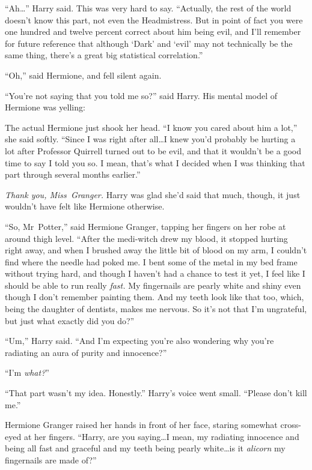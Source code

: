 “Ah…” Harry said. This was very hard to say. “Actually, the rest of the world doesn’t know this part, not even the Headmistress. But in point of fact you were one hundred and twelve percent correct about him being evil, and I’ll remember for future reference that although ‘Dark’ and ‘evil’ may not technically be the same thing, there’s a great big statistical correlation.”

“Oh,” said Hermione, and fell silent again.

“You’re not saying that you told me so?” said Harry. His mental model of Hermione was yelling: 

The actual Hermione just shook her head. “I know you cared about him a lot,” she said softly. “Since I was right after all…I knew you’d probably be hurting a lot after Professor Quirrell turned out to be evil, and that it wouldn’t be a good time to say I told you so. I mean, that’s what I decided when I was thinking that part through several months earlier.”

\emph{Thank you, Miss~Granger.} Harry was glad she’d said that much, though, it just wouldn’t have felt like Hermione otherwise.

“So, Mr~Potter,” said Hermione Granger, tapping her fingers on her robe at around thigh level. “After the medi-witch drew my blood, it stopped hurting right away, and when I brushed away the little bit of blood on my arm, I couldn’t find where the needle had poked me. I bent some of the metal in my bed frame without trying hard, and though I haven’t had a chance to test it yet, I feel like I should be able to run really \emph{fast.} My fingernails are pearly white and shiny even though I don’t remember painting them. And my teeth look like that too, which, being the daughter of dentists, makes me nervous. So it’s not that I’m ungrateful, but just what exactly did you do?”

“Um,” Harry said. “And I’m expecting you’re also wondering why you’re radiating an aura of purity and innocence?”

“I’m \emph{what?}”

“That part wasn’t my idea. Honestly.” Harry’s voice went small. “Please don’t kill me.”

Hermione Granger raised her hands in front of her face, staring somewhat cross-eyed at her fingers. “Harry, are you saying…I mean, my radiating innocence and being all fast and graceful and my teeth being pearly white…is it \emph{alicorn} my fingernails are made of?”

